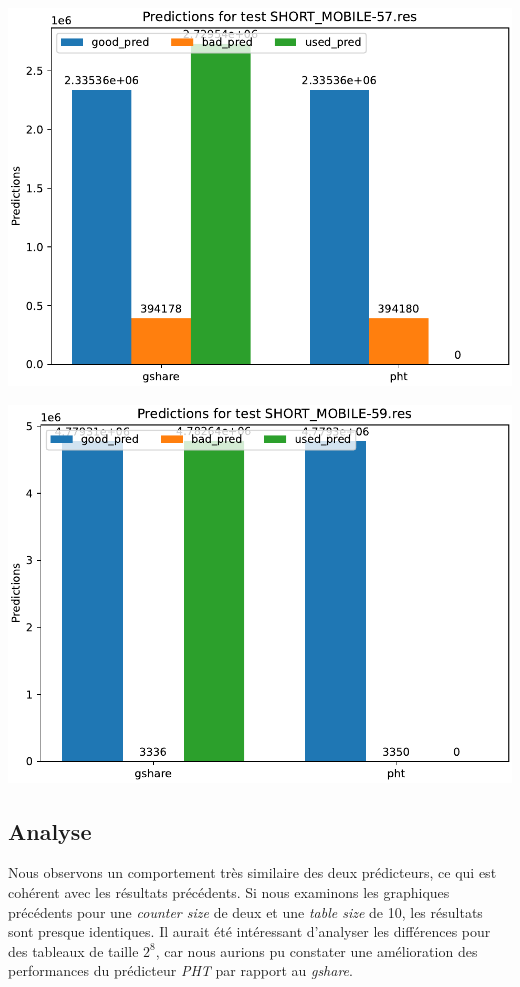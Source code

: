 \documentclass[a4paper]{article}
\begin{document}
\begin{minipage}{.48\linewidth}
\includegraphics[width=\linewidth]{graphs/dual-predictor/preds_SHORT_MOBILE-57.res.pdf}
\end{minipage}%
\hfill
\begin{minipage}{.48\linewidth}
\includegraphics[width=\linewidth]{graphs/dual-predictor/preds_SHORT_MOBILE-59.res.pdf}
\end{minipage}

\subsection{Analyse}

Nous observons un comportement très similaire des deux prédicteurs, ce qui est cohérent avec les résultats précédents. Si nous examinons les graphiques précédents pour une \textit{counter size} de deux et une \textit{table size} de 10, les résultats sont presque identiques. Il aurait été intéressant d'analyser les différences pour des tableaux de taille $2^8$, car nous aurions pu constater une amélioration des performances du prédicteur \textit{PHT} par rapport au \textit{gshare}.
\end{document}
